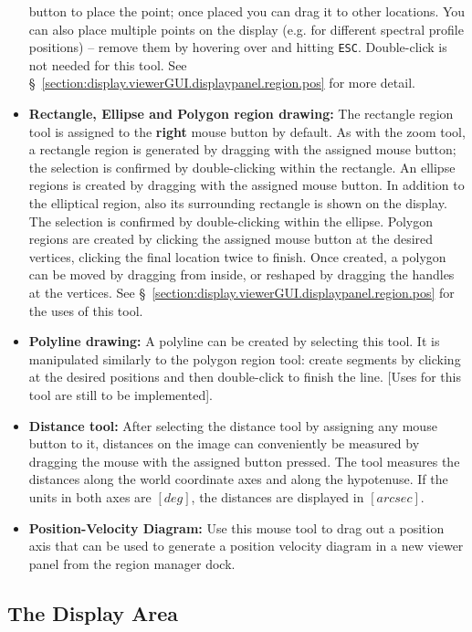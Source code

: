 \begin{itemize}
     button to place the point; once placed you can drag it to other
     locations. You can also place multiple points on the display
     (e.g. for different spectral profile positions) -- remove them by
     hovering over and hitting {\tt ESC}.  Double-click is not needed
     for this tool.  See
     \S~\ref{section:display.viewerGUI.displaypanel.region.pos} for more
     detail.
   \item {\bf Rectangle, Ellipse and Polygon region drawing:} The rectangle
     region tool is assigned to the {\bf right} mouse button by default.
     As with the zoom tool, a rectangle region is generated by dragging with
     the assigned mouse button; the selection is confirmed by double-clicking
     within the rectangle.
     An ellipse regions is created by dragging with the assigned mouse button.
     In addition to the elliptical region, also its surrounding rectangle is
     shown on the display. The selection is confirmed by double-clicking within
     the ellipse.
     Polygon regions are created by clicking the assigned mouse button
     at the desired vertices, clicking the final location twice to finish.
     Once created, a polygon can be moved by dragging from inside, or
     reshaped by dragging the handles at the vertices. 
     See \S~\ref{section:display.viewerGUI.displaypanel.region.pos} for the uses
     of this tool.
   \item {\bf Polyline drawing:}
     A polyline can be created by selecting this tool. It is manipulated
     similarly to the polygon region tool: create segments by clicking at
     the desired positions and then double-click to finish the line.
     [Uses for this tool are still to be implemented].
   \item {\bf Distance tool:}
     After selecting the distance tool by assigning any mouse button to it,
     distances on the image can conveniently be measured by dragging the
     mouse with the assigned button pressed. The tool measures the distances
     along the world coordinate axes and along the hypotenuse. If the units
     in both axes are $[deg]$, the distances are displayed in $[arcsec]$.
   \item {\bf Position-Velocity Diagram:} Use this mouse tool to drag out a position
   axis that can be used to generate a position velocity diagram in a new
   viewer panel from the region manager dock.
\end{itemize}

\subsection{The Display Area}
\label{section:display.viewerGUI.displaypanel.displayarea}

